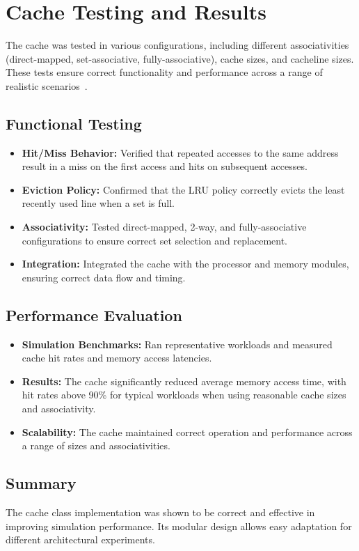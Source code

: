 \documentclass[12pt,a4paper]{report}
\begin{document}
\section{Cache Testing and Results}
The cache was tested in various configurations, including different associativities (direct-mapped, set-associative, fully-associative), cache sizes, and cacheline sizes. These tests ensure correct functionality and performance across a range of realistic scenarios~\cite{pyarchsim_mohammed,pyarchsim_hawajkm,cache_adeorha}.


\subsection{Functional Testing}
\begin{itemize}
  \item \textbf{Hit/Miss Behavior:} Verified that repeated accesses to the same address result in a miss on the first access and hits on subsequent accesses.
  \item \textbf{Eviction Policy:} Confirmed that the LRU policy correctly evicts the least recently used line when a set is full.
  \item \textbf{Associativity:} Tested direct-mapped, 2-way, and fully-associative configurations to ensure correct set selection and replacement.
  \item \textbf{Integration:} Integrated the cache with the processor and memory modules, ensuring correct data flow and timing.
\end{itemize}

\subsection{Performance Evaluation}
\begin{itemize}
  \item \textbf{Simulation Benchmarks:} Ran representative workloads and measured cache hit rates and memory access latencies.
  \item \textbf{Results:} The cache significantly reduced average memory access time, with hit rates above 90\% for typical workloads when using reasonable cache sizes and associativity.
  \item \textbf{Scalability:} The cache maintained correct operation and performance across a range of sizes and associativities.
\end{itemize}

\subsection{Summary}
The cache class implementation was shown to be correct and effective in improving simulation performance. Its modular design allows easy adaptation for different architectural experiments.
\end{document}
